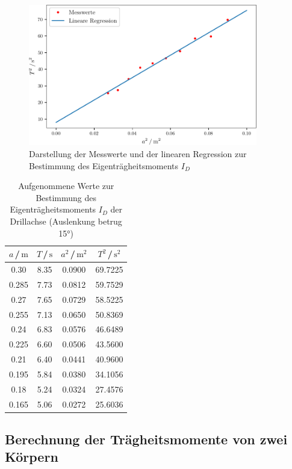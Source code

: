 \begin{figure}
    \centering
    \includegraphics[width=10cm]{build/plot.pdf}
    \caption{Darstellung der Messwerte und der linearen Regression zur Bestimmung des Eigenträgheitsmoments $I_D$}
\end{figure}


\begin{table}[H]
\normalsize

\centering
{}
\begin{tabular}{c c c c}
\toprule
    $a$\,/\,$\si{\meter}$ &  $T$\,/\,$\si{\second}$ & $a^2$\,/\,$\si{\meter}^2$ &  $T^2$\,/\,$\si{\second}^2$ \\
    \midrule

0.30  &   8.35 &  0.0900      & 69.7225\\
0.285 &   7.73 &  0.0812  & 59.7529\\
0.27  &   7.65 &  0.0729    & 58.5225\\
0.255 &   7.13 &  0.0650  & 50.8369\\
0.24  &   6.83 &  0.0576    & 46.6489\\
0.225 &   6.60 &  0.0506  & 43.5600\\
0.21  &   6.40 &  0.0441    & 40.9600\\
0.195 &   5.84 &  0.0380  & 34.1056\\
0.18  &   5.24 &  0.0324    & 27.4576\\
0.165 &   5.06 &  0.0272  & 25.6036\\ 

    \bottomrule
\end{tabular}
\caption{Aufgenommene Werte zur Bestimmung des Eigenträgheitsmoments $I_{D}$ der Drillachse (Auslenkung betrug 15°)}
\label{tab:a2}
\end{table}





\subsection{Berechnung der Trägheitsmomente von zwei Körpern}

